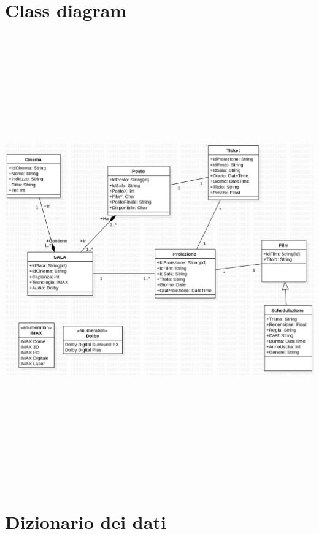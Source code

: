 \documentclass[12pt,a4paper]{book}
\begin{document}
	\section{Class diagram}
	\includegraphics[width = 400pt, height = 550pt]{UML}
	\section{Dizionario dei dati}
\end{document}

